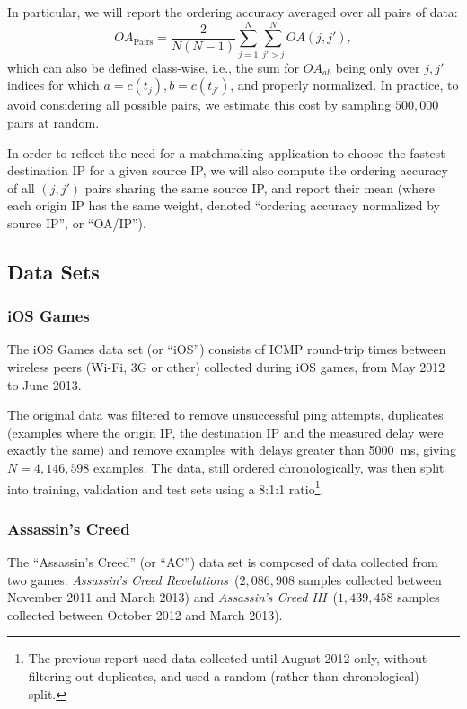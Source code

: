 \documentclass[10pt,a4paper,notitlepage,twocolumn]{article}
\begin{document}
In particular, we will report the ordering accuracy averaged over all
pairs of data:
\begin{equation}
 OA_{\text{Pairs}} =  \frac2{N(N-1)}\sum_{j=1}^N\sum_{j'>j}^N OA(j, j'),
\end{equation}
%
which can also be defined class-wise, i.e., the sum for $OA_{ab}$ being
only over $j,j'$ indices for which $a=c(t_j),b=c(t_{j'})$, and properly
normalized. In practice, to avoid considering all possible pairs,
we estimate this cost by sampling $500,000$ pairs at random.

In order to reflect the need for a matchmaking application to choose the
fastest destination IP for a given source IP, we will also compute the
ordering accuracy of all $(j, j')$ pairs sharing the same source IP, and
report their mean (where each origin IP has the same weight, denoted
``ordering accuracy normalized by source IP'', or ``OA/IP'').

\subsection{Data Sets}
\label{sec:data}

\subsubsection{iOS Games}
\label{sec:data_ios}

The iOS Games data set (or ``iOS'') consists of ICMP round-trip times
between wireless peers (Wi-Fi, 3G or other) collected during iOS games,
from May 2012 to June 2013.

The original data was filtered to remove unsuccessful ping attempts,
duplicates (examples where the origin IP, the destination IP and the
measured delay were exactly the same) and remove examples with delays
greater than 5000~ms, giving \mbox{$N=4,146,598$} examples.
The data, still ordered chronologically, was then
split into training, validation and test sets using a 8:1:1
ratio\footnote{The previous report used data collected until August 2012
only, without filtering out duplicates, and used a random (rather than
chronological) split.}.

\subsubsection{Assassin's Creed}

The ``Assassin's Creed'' (or ``AC'') data set is composed of data
collected from two games: {\em Assassin's Creed Revelations}\ 
($2,086,908$ samples collected between November 2011 and March 2013)
and {\em Assassin's Creed III}\ ($1,439,458$ samples collected between
October 2012 and March 2013).
\end{document}
